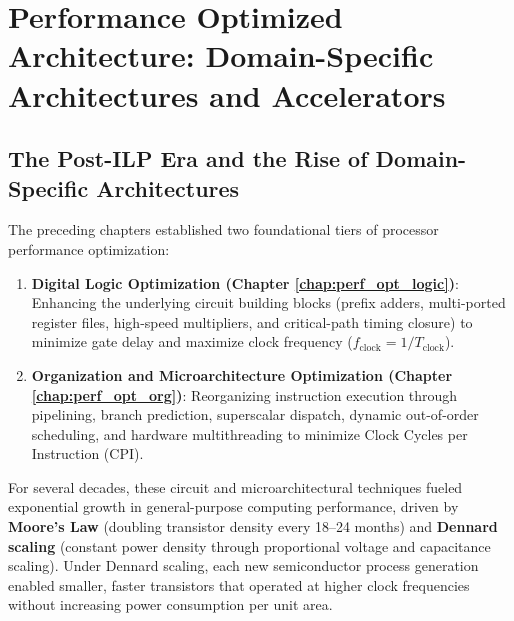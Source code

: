 
\chapter{Performance Optimized Architecture: Domain-Specific Architectures and Accelerators}\label{chap:dsa_architecture}
\localtoc

\section{The Post-ILP Era and the Rise of Domain-Specific Architectures}\label{sec:post_ilp_dsa}

The preceding chapters established two foundational tiers of processor performance optimization:
\begin{enumerate}
    \item \textbf{Digital Logic Optimization (Chapter \ref{chap:perf_opt_logic})}: Enhancing the underlying circuit building blocks (prefix adders, multi-ported register files, high-speed multipliers, and critical-path timing closure) to minimize gate delay and maximize clock frequency ($f_{\text{clock}} = 1/T_{\text{clock}}$).
    \item \textbf{Organization and Microarchitecture Optimization (Chapter \ref{chap:perf_opt_org})}: Reorganizing instruction execution through pipelining, branch prediction, superscalar dispatch, dynamic out-of-order scheduling, and hardware multithreading to minimize Clock Cycles per Instruction ($\text{CPI}$).
\end{enumerate}

For several decades, these circuit and microarchitectural techniques fueled exponential growth in general-purpose computing performance, driven by \textbf{Moore's Law} (doubling transistor density every 18--24 months) and \textbf{Dennard scaling} (constant power density through proportional voltage and capacitance scaling). Under Dennard scaling, each new semiconductor process generation enabled smaller, faster transistors that operated at higher clock frequencies without increasing power consumption per unit area.

